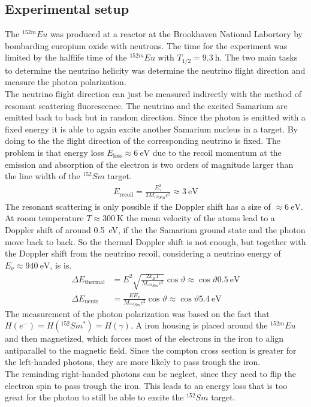 \subsection{Experimental setup}
The $^{152m}Eu$ was produced at a reactor at the Brookhaven National Labortory by bombarding europium oxide with neutrons. The time for the experiment was limited by the halflife time of the  $^{152m}Eu$ with $T_{1/2}=\SI{9.3}{\hour}$. The two main tasks to determine the neutrino helicity was determine the neutrino flight direction and measure the photon polarization.\\
The neutrino flight direction can just be measured indirectly with the method of resonant scattering fluorescence. The neutrino and the excited Samarium are emitted back to back but in random direction. Since the photon is emitted with a fixed energy it is able to again excite another Samarium nucleus in a target. By doing to the the flight direction of the corresponding neutrino is fixed. The problem is that energy loss $E_{\text{loss}} \approx \SI{6}{\electronvolt}$ due to the recoil momentum at the emission and absorption of the electron is two orders of magnitude larger than the line width of the $^{152}Sm$ target.
\begin{align*}
	E_{\text{recoil}} = \frac{E_{\gamma}^2}{2M_{^{152}Sm}c^2} \approx \SI{3}{\electronvolt}
\end{align*}
The resonant scattering is only possible if the Doppler shift has a size of $\approx \SI{6}{\electronvolt}$. At room temperature $T\approx \SI{300}{\kelvin}$ the mean velocity of the atoms lead to a Doppler shift of around \SI{0.5}{\electronvolt}, if the the Samarium ground state and the photon move back to back. So the thermal Doppler shift is not enough, but together with the Doppler shift from the neutrino recoil, considering a neutrino energy of $E_{\nu} \approx \SI{940}{\electronvolt}$, is is.
\begin{align*}
	\Delta E_{\text{thermal}} &= E^2 \sqrt{\frac{2 k_B T}{M_{^{152}Sm} c^2}}\cos \vartheta \approx \cos \vartheta \SI{0.5}{\electronvolt} \\
	 \Delta E_{\text{neutr}} &= \frac{E E_{\nu}}{M_{^{152}Sm} c^2}\cos \vartheta \approx \cos \vartheta \SI{5.4}{\electronvolt}
\end{align*}
The measurement of the photon polarization was based on the fact that $H(e^{-})= H(^{152}Sm^*) = H(\gamma)$. A iron housing is placed around the $^{152m}Eu$ and then magnetized, which forces most of the electrons in the iron to align antiparallel to the magnetic field. Since the compton cross section is greater for the left-handed photons, they are more likely to pass trough the iron.\\
The reminding right-handed photons can be neglect, since they need to flip the electron spin to pass trough the iron. This leads to an energy loss that is too great for the photon to still be able to excite the $^{152}Sm$ target.

